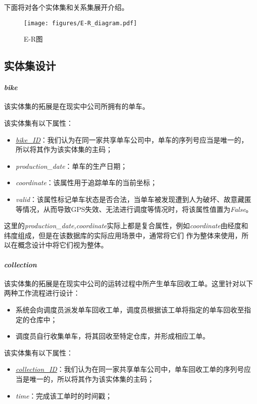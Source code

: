 下面将对各个实体集和关系集展开介绍。
\begin{figure}[htbp]
  \centering
  \texttt{[image: figures/E-R\_diagram.pdf]}
  \caption{E-R图}
  \label{fig:E-R diagram}
\end{figure}
\subsection{实体集设计}
\paragraph{\textit{bike}}
该实体集的拓展是在现实中公司所拥有的单车。

该实体集有以下属性：
\begin{itemize}
  \item \textit{\underline{bike\_ID}}：我们认为在同一家共享单车公司中，单车的序列号应当是唯一的，所以将其作为该实体集的主码；
  \item \textit{production\_date}：单车的生产日期；
  \item \textit{coordinate}：该属性用于追踪单车的当前坐标；
  \item \textit{valid}：该属性标记单车状态是否合法，当单车被发现遭到人为破坏、故意藏匿等情况，从而导致GPS失效、无法进行调度等情况时，将该属性值置为\textit{False}。
\end{itemize}

这里的\textit{production\_date,coordinate}实际上都是复合属性，例如\textit{coordinate}由经度和纬度组成，但是在该数据库的实际应用场景中，通常将它们
作为整体来使用，所以在概念设计中将它们视为整体。

\paragraph{\textit{collection}}
该实体集的拓展是在现实中公司的运转过程中所产生单车回收工单。这里针对以下两种工作流程进行设计：
\begin{itemize}
\item 系统会向调度员派发单车回收工单，调度员根据该工单将指定的单车回收至指定的仓库中；
\item 调度员自行收集单车，将其回收至特定仓库，并形成相应工单。
\end{itemize}

该实体集有以下属性：
\begin{itemize}
  \item \textit{\underline{collection\_ID}}：我们认为在同一家共享单车公司中，单车回收工单的序列号应当是唯一的，所以将其作为该实体集的主码；
  \item \textit{time}：完成该工单时的时间戳；
\end{itemize}

